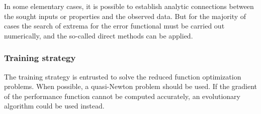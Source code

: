 In some elementary cases, it is possible to establish analytic
connections between the sought inputs or properties and the observed
data. But for the majority of cases the search of extrema for the
error functional must be carried out numerically, and the so-called
direct methods can be applied.

\subsubsection*{Training strategy}

The training strategy is entrusted to solve the reduced function optimization problems. 
When possible, a quasi-Newton problem should be used. 
If the gradient of the performance function cannot be computed accurately, an evolutionary algorithm could be used instead. 

